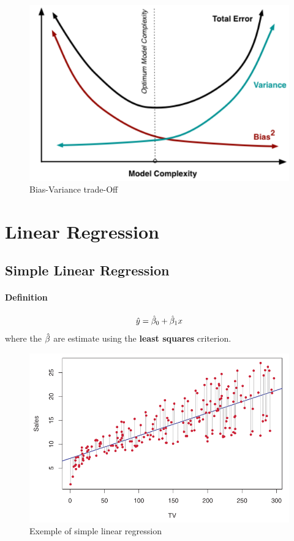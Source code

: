 \begin{figure}[!ht]
    \centering
    \includegraphics[scale=0.7]{src/StatisticalLearning/Trade-off_Variance-Bias.PNG}
    \caption{Bias-Variance trade-Off}
\end{figure}

\section{Linear Regression}

\subsection{Simple Linear Regression}
\paragraph{Definition}
\[ \hat{y} = \hat{\beta}_0 + \hat{\beta}_1 x \]
where the $\hat{\beta}$ are estimate using the \textbf{least squares} criterion.

\begin{figure}[!ht]
    \centering
    \includegraphics[scale=0.5]{src/StatisticalLearning/SimpleLinearRegression.PNG}
    \caption{Exemple of simple linear regression}
\end{figure}

